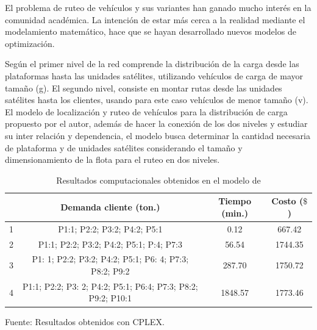 \documentclass[a4paper, 12pt]{article}
\begin{document}
\vskip 0.4cm
El problema de ruteo de vehículos \citep{Ombuki, Yeun} y sus variantes han ganado mucho interés en la comunidad académica. La intención de estar más cerca a la realidad mediante el modelamiento matemático, hace que se hayan desarrollado nuevos modelos de optimización. \par
\vskip 0.4cm
Según \cite{Sterle} el primer nivel de la red comprende la distribución de la carga desde las plataformas hasta las unidades satélites, utilizando vehículos de carga de mayor tamaño (g).  El segundo nivel, consiste en montar rutas desde las unidades satélites hasta los clientes, usando para este caso vehículos de menor tamaño (v). El modelo de localización y ruteo de vehículos para la distribución de carga propuesto por el autor, además de hacer la conexión de los dos niveles y estudiar su inter relación y dependencia, el modelo busca determinar la cantidad necesaria de plataforma y de unidades satélites considerando el tamaño y dimensionamiento de la flota para el ruteo en dos niveles. 
\vskip 0.2cm


\begin{table}[h!]
\begin{center}
\caption{\small{Resultados computacionales obtenidos en el modelo de \cite{Sterle}}}
\end{center}
\vskip -0.7cm
\begin{tabular}{cccc} \toprule %
\hline 
\rowcolor{LightBlue2}{\small Escenarios} & {\small Demanda cliente (ton.)} & {\small Tiempo (min.)} & {\small Costo ($\$$)} \\ \hline 
{\small 1} & {\small P1:1; P2:2; P3:2; P4:2; P5:1} & {\small 0.12} & {\small 667.42} \\ \hline 
{\small 2} & {\small P1:1; P2:2; P3:2; P4:2; P5:1; P:4; P7:3} & {\small 56.54} & {\small 1744.35} \\ \hline 
{\small 3} & {\small P1: 1; P2:2; P3:2; P4:2; P5:1; P6: 4; P7:3; P8:2; P9:2} & {\small 287.70} & {\small 1750.72} \\  \hline 
{\small 4} & {\small P1:1; P2:2; P3: 2; P4:2; P5:1; P6:4; P7:3; P8:2; P9:2; P10:1} & {\small 1848.57} & {\small 1773.46} \\   \bottomrule \hline 
\end{tabular} 
\begin{center}
\vskip -0.2cm
{\small{Fuente: Resultados obtenidos con CPLEX.}}
\end{center}
\end{table}
\end{document}
